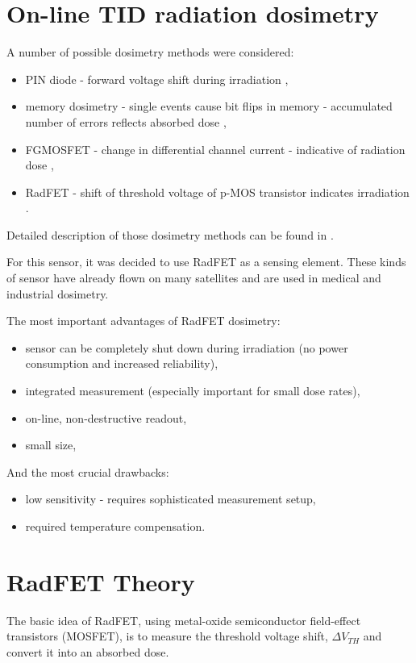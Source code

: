 \section{On-line TID radiation dosimetry}
    A number of possible dosimetry methods were considered:
    \begin{itemize}
        \item PIN diode - forward voltage shift during irradiation \cite{PIN_dosimetry},
        \item memory dosimetry - single events cause bit flips in memory - accumulated number of errors reflects absorbed dose \cite{RadFET_PhD},
        \item FGMOSFET - change in differential channel current - indicative of radiation dose \cite{FGMOSFET_patent},
        \item RadFET - shift of threshold voltage of p-MOS transistor indicates irradiation \cite{RadFET_PhD}.
    \end{itemize}
    Detailed description of those dosimetry methods can be found in \cite{RadFET_PhD}.

    For this sensor, it was decided to use RadFET as a sensing element. These kinds of sensor have already flown on many satellites and are used in medical and industrial dosimetry.

    The most important advantages of RadFET dosimetry:
    \begin{itemize}
        \item sensor can be completely shut down during irradiation (no power consumption and increased reliability),
        \item integrated measurement (especially important for small dose rates),
        \item on-line, non-destructive readout,
        \item small size,
    \end{itemize}
    And the most crucial drawbacks:
    \begin{itemize}
        \item low sensitivity - requires sophisticated measurement setup,
        \item required temperature compensation.
    \end{itemize}


\section{RadFET Theory}
    The basic idea of RadFET, using metal-oxide semiconductor field-effect transistors (MOSFET), is to measure the threshold voltage shift, $\Delta V_{TH}$ and convert it into an absorbed dose.

